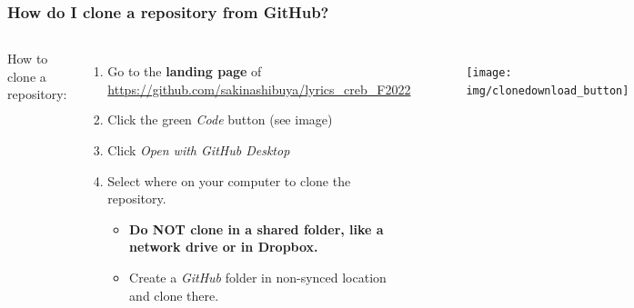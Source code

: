 \documentclass[aspectratio=169]{beamer} %
\newcommand{\trainingURL}[1]{{\color{blue}\url{#1}}}
\newcommand{\traininerUsername}{sakinashibuya}
\newcommand{\repoName}{\traininerUsername/lyrics_creb_F2022}
\newcommand{\trainingRepoURL}[1]{\trainingURL{https://github.com/\repoName #1}}
\begin{document}
\begin{frame}
\frametitle{How do I clone a repository from GitHub?}

	\begin{columns}[c]

		How to clone a repository:
		\begin{enumerate}
			\setlength\itemsep{3mm}
			\item Go to the \textbf{landing page} of \trainingRepoURL{}
			\item Click the green \textit{Code} button (see image)
			\item Click \textit{Open with GitHub Desktop}
			\item Select where on your computer to clone the repository. \\
			\begin{itemize}
				\item \textbf{Do NOT clone in a shared folder, like a network drive or in Dropbox.} 
				\item Create a \textit{GitHub} folder in non-synced location and clone there.
			\end{itemize}
		\end{enumerate}

		\begin{figure}
			\centering
			\texttt{[image: img/clonedownload\_button]}
			\label{fig:clonedownloadbutton}
		\end{figure}

	\end{columns}

\end{frame}
\end{document}
